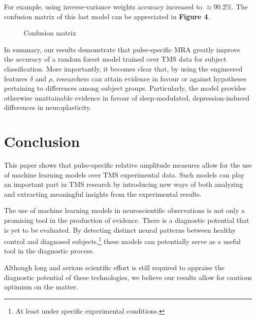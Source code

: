 \documentclass{article}
\begin{document}
\begin{multicols}{2}
For example, using inverse-variance weights accuracy increased to $\approx
90.2\%$. The confusion matrix of this last model can be appreciated in
\textbf{Figure 4}.

\begin{figure}[H]
    \centering
    \caption{Confusion matrix}
    \label{fig:figure4}
\end{figure}

In summary, our results demonstrate that pulse-specific MRA greatly improve the
accuracy of a random forest model trained over TMS data for subject
classification. More importantly, it becomes clear that, by using the engineered
features $\delta$ and $\rho$, researchers can attain evidence in favour or
against hypotheses pertaining to differences among subject groups. Particularly,
the model provides otherwise unattainable evidence in favour of sleep-modulated,
depression-induced differences in neuroplasticity.

\section{Conclusion}

This paper shows that pulse-specific relative amplitude measures allow for the
use of machine learning models over TMS experimental data. Such models
can play an important part in TMS research by introducing new ways of
both analyzing and extracting meaningful insights from the experimental results.

The use of machine learning models in neuroscientific observations is not only a
promising tool in the production of evidence. There is a diagnostic potential
that is yet to be evaluated. By detecting distinct neural patterns between
healthy control and diagnosed subjects,\footnote{At least under specific
experimental conditions.} these models can potentially serve as a useful tool in
the diagnostic process.

Although long and serious scientific effort is still required to appraise the
diagnostic potential of these technologies, we believe our results allow
for cautious optimism on the matter.


\end{multicols}
\end{document}
